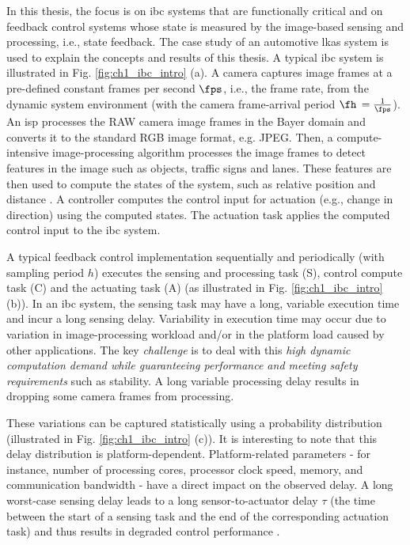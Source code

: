In this thesis, the focus is on \gls{ibc} systems that are functionally critical and on feedback control systems whose state is measured by the image-based sensing and processing, i.e., state feedback.
The case study of an automotive \gls{lkas} system is used to explain the concepts and results of this thesis.
A typical \gls{ibc} system is illustrated in Fig. \ref{fig:ch1_ibc_intro} (a).
A camera captures image frames at a pre-defined constant frames per second $\fps$, i.e., the frame rate, from the dynamic system environment (with the camera frame-arrival period $\fh$ $=\frac{1}{\fps}$).
An \gls{isp} processes the RAW camera image frames in the Bayer domain and converts it to the standard RGB image format, e.g. JPEG. 
Then, a compute-intensive image-processing algorithm processes the image frames to detect features in the image such as objects, traffic signs and lanes.
These features are then used to compute the states of the system, such as relative position and distance \cite{corke2017robotics}.
A controller computes the control input for actuation (e.g., change in direction) using the computed states.
The actuation task applies the computed control input to the \gls{ibc} system.

A typical feedback control implementation sequentially and
periodically (with sampling period $h$) executes the sensing and processing task (S), control compute task (C) and the actuating task (A) (as illustrated in Fig. \ref{fig:ch1_ibc_intro} (b)).
In an \gls{ibc} system, the sensing task may have a long, variable execution time and incur a long sensing delay. 
Variability in execution time may occur due to variation in image-processing workload and/or in the platform load caused by other applications.
The key \textit{challenge} is to deal with this \textit{high dynamic computation demand while guaranteeing performance and meeting safety requirements} such as stability.
A long variable processing delay results in dropping some camera frames from processing. 

These variations can be captured statistically using a probability distribution \cite{adyanthaya2014robustness} (illustrated in Fig. \ref{fig:ch1_ibc_intro} (c)).
It is interesting to note that this delay distribution is platform-dependent.
Platform-related parameters - for instance, number of processing cores, processor clock speed, memory, and communication bandwidth - have a direct impact on the observed delay. 
A long worst-case sensing delay leads to a long sensor-to-actuator delay $\tau$ (the time between the start of a sensing task and the end of the corresponding actuation task) and thus results in degraded control performance \cite{sharkey1996delays,aastrom2013computer}.

